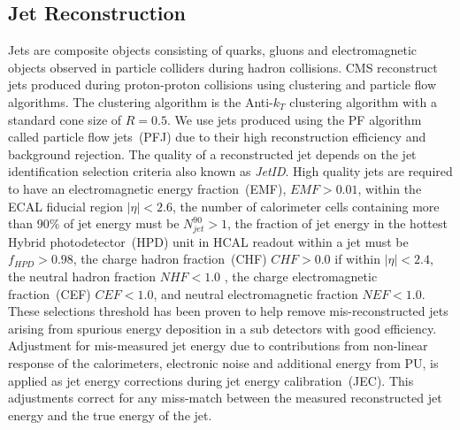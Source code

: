 \subsection{Jet Reconstruction}
Jets are composite objects consisting of quarks, gluons and electromagnetic objects observed in particle colliders during hadron collisions. CMS reconstruct jets produced during proton-proton collisions using clustering and particle flow algorithms.
The clustering algorithm is the Anti-$k_{T}$ clustering algorithm with a standard cone size of $R = 0.5$.
We use jets produced using the PF algorithm called particle flow jets~(PFJ) due to their high reconstruction efficiency and background rejection.
The quality of a reconstructed jet depends on the jet identification selection criteria also known as \textit{JetID}.
High quality jets are required to have an electromagnetic energy fraction~(EMF), $EMF > 0.01$,  within the ECAL fiducial region $|\eta| < 2.6$, the number of calorimeter cells containing more than 90\% of jet energy  must be $N^{90}_{jet} > 1$, the fraction of jet energy in the hottest  Hybrid photodetector~(HPD) unit  in HCAL readout within a jet must be $f_{HPD} > 0.98$, the charge  hadron fraction~(CHF) $CHF >0.0$ if within $|\eta| < 2.4$, the neutral hadron fraction $NHF < 1.0$ , the charge electromagnetic fraction~(CEF) $CEF < 1.0$, and neutral electromagnetic fraction $NEF < 1.0 $. These selections threshold has been proven to help remove mis-reconstructed jets arising from spurious energy deposition in a sub detectors with good efficiency.
Adjustment for mis-measured jet energy due to contributions from non-linear response of the calorimeters, electronic noise and additional energy from PU, is applied as jet energy corrections during jet energy calibration~(JEC). This adjustments correct for any miss-match between the measured reconstructed jet energy and the true energy of the jet. 


